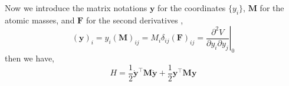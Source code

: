 \documentclass[a4paper,notitlepage,preprint]{revtex4-1}
\newcommand\mbf{\mathbf}
\begin{document}
Now we introduce the matrix notations $\mbf{y}$ for the coordinates $\{y_i\}$, $\mbf{M}$ for the atomic masses, and $\mbf{F}$ for the second derivatives ,
\begin{subequations}
	\begin{equation}
	(\mbf{y})_i = y_i
	\end{equation}
	\begin{equation}
		(\mbf{M})_{ij} = M_i \delta_{ij}
		\label{eq:Mm}
	\end{equation}
	\begin{equation}
		(\mbf{F})_{ij} = \left. \frac{\partial^2 V}{\partial y_i \partial y_j} \right\vert_0
		\label{eq:Fm}
	\end{equation}
	\label{eq:matrix1}
\end{subequations}
\noindent then we have,
\begin{equation}
	H = \frac{1}{2}\dot{\mbf{y}}^\top \mbf{M} \dot{\mbf{y}} + \frac{1}{2} \mbf{y}^\top\mbf{M}\mbf{y}
	\label{eq:Hym}
\end{equation}
\end{document}
